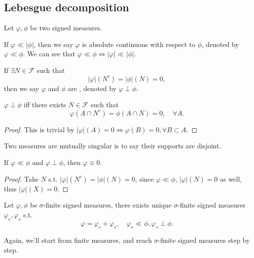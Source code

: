 \subsection{Lebesgue decomposition}
\label{sub:Lebesgue decomposition}
Let $\varphi, \phi$ be two signed measures.

If $\varphi \ll |\phi|$, then we say $\varphi$ is absolute continuous
with respect to $\phi$, denoted by $\varphi \ll \phi$.
We can see that $\varphi \ll \phi \iff |\varphi|\ll |\phi|$.

\begin{definition}
	If $\exists N\in \mathscr{F}$ such that
	\[
	|\varphi|(N^c) = |\phi|(N) = 0,
	\]
	then we say $\varphi$ and $\phi$ are ,
	denoted by $\varphi \perp \phi$.
\end{definition}

\begin{lemma}
	$\varphi \perp \phi$ iff there exists $N\in \mathscr{F}$ such that
	\[
	\varphi(A\cap N^c) = \phi(A\cap N) = 0, \quad \forall A.
	\]
\end{lemma}
\begin{proof}[Proof]
    This is trivial by $|\varphi|(A) = 0 \iff \varphi(B) = 0, \forall B \subset A$.
\end{proof}

Two measures are mutually singular is to say their supports are disjoint.

\begin{lemma}
	If $\varphi \ll \phi$ and $\varphi \perp \phi$, then $\varphi \equiv 0$.
\end{lemma}
\begin{proof}[Proof]
    Take $N$ s.t. $|\varphi|(N^c) = |\phi|(N) = 0$, since $\varphi \ll \phi$,
	$|\varphi|(N) = 0$ as well, thus $|\varphi|(X) = 0$.
\end{proof}

\begin{theorem}
    Let $\varphi, \phi$ be $\sigma$-finite signed measures, there exists
	unique $\sigma$-finite signed measures $\varphi_c, \varphi_s$ s.t.
	\[
	\varphi = \varphi_c + \varphi_s, \quad \varphi_c \ll \phi, \varphi_s \perp \phi.
	\]
\end{theorem}

Again, we'll start from finite measures, and reach $\sigma$-finite signed measures
step by step.

